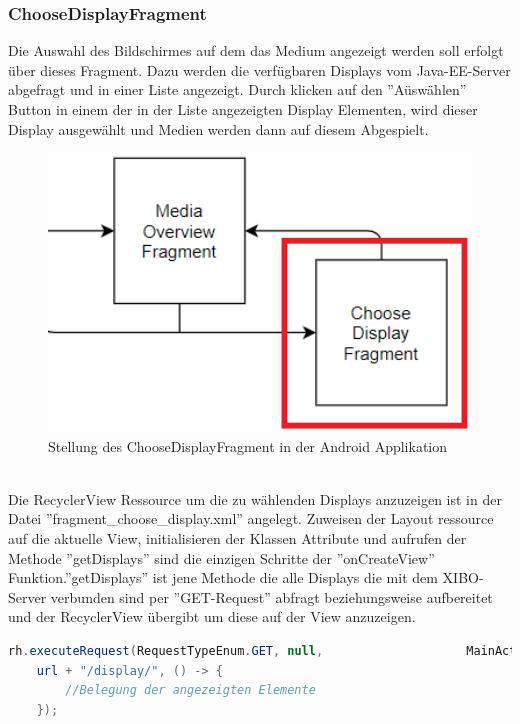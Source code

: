 \subsubsection{ChooseDisplayFragment}
Die Auswahl des Bildschirmes auf dem das Medium angezeigt werden soll erfolgt über dieses Fragment. Dazu werden die verfügbaren Displays vom Java-EE-Server abgefragt und in einer Liste angezeigt. Durch klicken auf den ''Aüswählen'' Button in einem der in der Liste angezeigten Display Elementen, wird dieser Display ausgewählt und Medien werden dann auf diesem Abgespielt. 
\\
\begin{figure}[H]
\centering
\includegraphics[width=1.0\textwidth]{images/06_AndroidApp/06_ChooseDisplayStellung}
\caption{Stellung des ChooseDisplayFragment in der Android Applikation}
\label{fig:mediaNav}
\end{figure}
\\
Die RecyclerView Ressource um die zu wählenden Displays anzuzeigen ist in der Datei ''fragment\_choose\_display.xml'' angelegt. Zuweisen der Layout ressource auf die aktuelle View, initialisieren der Klassen Attribute und aufrufen der Methode ''getDisplays'' sind die einzigen Schritte der ''onCreateView'' Funktion.''getDisplays'' ist jene Methode die alle Displays die mit dem XIBO-Server verbunden sind per ''GET-Request'' abfragt beziehungsweise aufbereitet und der RecyclerView übergibt um diese auf der View anzuzeigen. 
\begin{lstlisting}[language=Java,caption={Abfragen und anzeigen der Displays im ChooseDisplayFragment}]
rh.executeRequest(RequestTypeEnum.GET, null,					MainActivityBottomNavigation.getInstance().
	url + "/display/", () -> {
		//Belegung der angezeigten Elemente
	});
\end{lstlisting}
